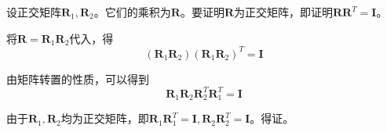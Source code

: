 \documentclass{homework}
\begin{document}
\question 

\begin{sol}
  设正交矩阵$ \mathbf{R}_1, \mathbf{R}_2 $。它们的乘积为$ \mathbf{R} $。要证明$ \mathbf{R} $为正交矩阵，即证明$ \mathbf{R} \mathbf{R}^T = \mathbf{I} $。

  将$ \mathbf{R} = \mathbf{R}_1 \mathbf{R}_2 $代入，得
  \[
    (\mathbf{R}_1 \mathbf{R}_2)(\mathbf{R}_1 \mathbf{R}_2)^T = \mathbf{I}
  \]

  由矩阵转置的性质，可以得到
  \[
    \mathbf{R}_1 \mathbf{R}_2 \mathbf{R}_2^T \mathbf{R}_1^T = \mathbf{I}
  \]

  由于$ \mathbf{R}_1, \mathbf{R}_2 $均为正交矩阵，即$ \mathbf{R}_1 \mathbf{R}_1^T = \mathbf{I}, \mathbf{R}_2 \mathbf{R}_2^T = \mathbf{I} $。得证。
  
\end{sol}

\question 
\end{document}

